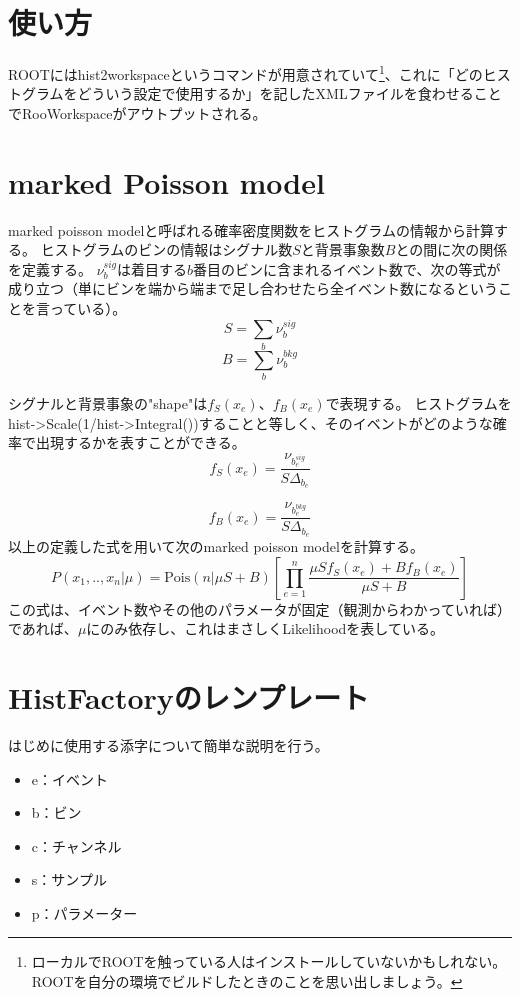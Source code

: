 \documentclass[a4paper,uplatex]{jsreport}
\begin{document}
\begin{euation}
\begin{euation}
\begin{euation}
\begin{euation}
\section{使い方}
ROOTにはhist2workspaceというコマンドが用意されていて\footnote{ローカルでROOTを触っている人はインストールしていないかもしれない。ROOTを自分の環境でビルドしたときのことを思い出しましょう。}、これに「どのヒストグラムをどういう設定で使用するか」を記したXMLファイルを食わせることでRooWorkspaceがアウトプットされる。

\section{marked Poisson model}
marked poisson modelと呼ばれる確率密度関数をヒストグラムの情報から計算する。
ヒストグラムのビンの情報はシグナル数$S$と背景事象数$B$との間に次の関係を定義する。
$\nu_{b}^{sig}$は着目する$b$番目のビンに含まれるイベント数で、次の等式が成り立つ（単にビンを端から端まで足し合わせたら全イベント数になるということを言っている）。
\begin{equation}
  S = \sum_{b} \nu_{b}^{sig}
\end{equation}
\begin{equation}
  B = \sum_{b} \nu_{b}^{bkg}
\end{equation}

シグナルと背景事象の"shape"は$f_S(x_e)$、$f_B(x_e)$で表現する。
ヒストグラムをhist->Scale(1/hist->Integral())することと等しく、そのイベントがどのような確率で出現するかを表すことができる。
\begin{equation}
  f_S(x_e) = \frac{\nu_b_{e}^{sig}}{S\Delta_{b_e}}
\end{equation}

\begin{equation}
  f_B(x_e) = \frac{\nu_b_{e}^{bkg}}{S\Delta_{b_e}}
\end{equation}
以上の定義した式を用いて次のmarked poisson modelを計算する。
\begin{equation}
  P({x_1,..,x_n}|\mu) = \mathrm{Pois}(n|\mu S+B) \left[ \prod_{e=1}^{n}\frac{\mu Sf_S(x_e)+Bf_B(x_e)}{\mu S+B} \right]
\end{equation}
この式は、イベント数やその他のパラメータが固定（観測からわかっていれば）であれば、$\mu$にのみ依存し、これはまさしくLikelihoodを表している。

\section{HistFactoryのレンプレート}
はじめに使用する添字について簡単な説明を行う。
\begin{itemize}
  \item e：イベント
  \item b：ビン
  \item c：チャンネル
  \item s：サンプル
  \item p：パラメーター
\end{itemize}


\end{euation}
\end{euation}
\end{euation}
\end{euation}
\end{document}
